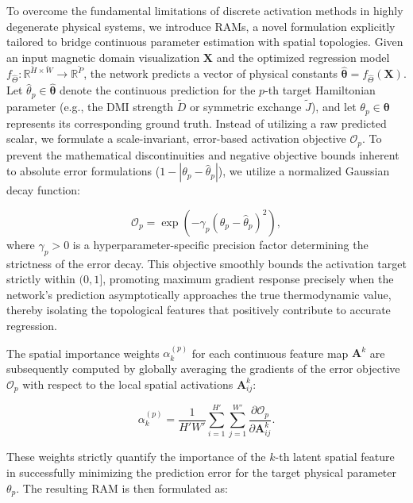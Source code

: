 \documentclass[letterpaper, 12, one column]{article}
\begin{document}
To overcome the fundamental limitations of discrete activation methods in highly degenerate physical systems, we introduce RAMs, a novel formulation explicitly tailored to bridge continuous parameter estimation with spatial topologies. Given an input magnetic domain visualization $\mathbf{X}$ and the optimized regression model $f_{\hat{\Theta}} : \mathbb{R}^{\breve{H} \times \breve{W}} \rightarrow \mathbb{R}^{\breve{P}}$, the network predicts a vector of physical constants $\hat{\boldsymbol{\theta}} = f_{\hat{\Theta}}(\mathbf{X})$. Let $\hat{\theta}_p \in \hat{\boldsymbol{\theta}}$ denote the continuous prediction for the $p$-th target Hamiltonian parameter (e.g., the DMI strength $\tilde{D}$ or symmetric exchange $\tilde{J}$), and let $\theta_p \in \boldsymbol{\theta}$ represents its corresponding ground truth. Instead of utilizing a raw predicted scalar, we formulate a scale-invariant, error-based activation objective $\mathcal{O}_p$. To prevent the mathematical discontinuities and negative objective bounds inherent to absolute error formulations ($1 - |\theta_p - \hat{\theta}_p|$), we utilize a normalized Gaussian decay function:

\begin{equation}\label{eq:RAM_Objective}
\mathcal{O}_p = \exp\left(-\gamma_p \left(\theta_p - \hat{\theta}_p\right)^2\right),
\end{equation}
where $\gamma_p>0$ is a hyperparameter-specific precision factor determining the strictness of the error decay. This objective smoothly bounds the activation target strictly within $(0, 1]$, promoting maximum gradient response precisely when the network's prediction asymptotically approaches the true thermodynamic value, thereby isolating the topological features that positively contribute to accurate regression.

The spatial importance weights $\alpha_k^{(p)}$ for each continuous feature map $\mathbf{A}^k$ are subsequently computed by globally averaging the gradients of the error objective $\mathcal{O}_p$ with respect to the local spatial activations $\mathbf{A}_{ij}^k$:

\begin{equation}\label{eq:RAM_Weights}
\alpha_k^{(p)} = \frac{1}{H' W'} \sum_{i=1}^{H'} \sum_{j=1}^{W'} \frac{\partial \mathcal{O}_p}{\partial \mathbf{A}_{ij}^k}.
\end{equation}

These weights strictly quantify the importance of the $k$-th latent spatial feature in successfully minimizing the prediction error for the target physical parameter $\theta_p$. The resulting RAM is then formulated as:
\end{document}
